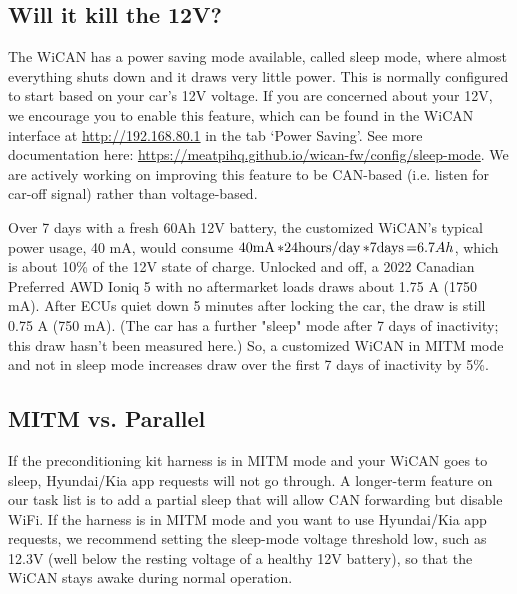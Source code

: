 \documentclass[superscriptaddress,onecolumn,floatfix]{revtex4-2}
\begin{document}
\subsection{Will it kill the 12V?}

The WiCAN has a power saving mode available, called sleep mode, where almost everything shuts down and it draws very little power. This is normally configured to start based on your car's 12V voltage. If you are concerned about your 12V, we encourage you to enable this feature, which can be found in the WiCAN interface at \href{http://192.168.80.1}{http://192.168.80.1} in the tab `Power Saving'. See more documentation here: \href{https://meatpihq.github.io/wican-fw/config/sleep-mode}{https://meatpihq.github.io/wican-fw/config/sleep-mode}. We are actively working on improving this feature to be CAN-based (i.e. listen for car-off signal) rather than voltage-based. 

Over 7 days with a fresh 60Ah 12V battery, the customized WiCAN's typical power usage, 40 mA, would consume $40 \unit[\mathrm{mA}] * 24 \unit[\mathrm{hours/day}] * 7 \unit[\mathrm{days}] = 6.7 Ah$, which is about 10\% of the 12V state of charge. Unlocked and off, a 2022 Canadian Preferred AWD Ioniq 5 with no aftermarket loads draws about 1.75 A (1750 mA). After ECUs quiet down 5 minutes after locking the car, the draw is still 0.75 A (750 mA). (The car has a further "sleep" mode after 7 days of inactivity; this draw hasn't been measured here.) So, a customized WiCAN in MITM mode and not in sleep mode increases draw over the first 7 days of inactivity by 5\%.

\subsection{MITM vs. Parallel}
If the preconditioning kit harness is in MITM mode and your WiCAN goes to sleep, Hyundai/Kia app requests will not go through. A longer-term feature on our task list is to add a partial sleep that will allow CAN forwarding but disable WiFi. If the harness is in MITM mode and you want to use Hyundai/Kia app requests, we recommend setting the sleep-mode voltage threshold low, such as 12.3V (well below the resting voltage of a healthy 12V battery), so that the WiCAN stays awake during normal operation. 
\end{document}
